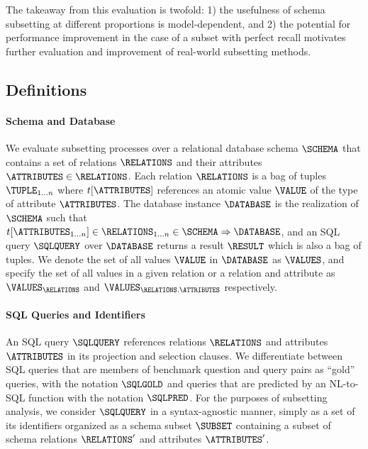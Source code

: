 The takeaway from this evaluation is twofold: 1) the usefulness of schema subsetting at different proportions is model-dependent, and 2) the potential for performance improvement in the case of a subset with perfect recall motivates further evaluation and improvement of real-world subsetting methods.

\subsection{Definitions}

\paragraph{\textbf{Schema and Database}}

We evaluate subsetting processes over a relational database schema $\SCHEMA$ that contains a set of relations $\RELATIONS$ and their attributes $\ATTRIBUTES \in \RELATIONS$.
Each relation $\RELATIONS$ is a bag of tuples $\TUPLE_{1...n}$ where $t[\ATTRIBUTES]$ references an atomic value $\VALUE$ of the type of attribute $\ATTRIBUTES$. 
The database instance $\DATABASE$ is the realization of $\SCHEMA$ such that 
$t[\ATTRIBUTES_{1...n}] \in \RELATIONS_{1...n} \in \SCHEMA \Rightarrow \DATABASE$, and an SQL query $\SQLQUERY$ over $\DATABASE$ returns a result $\RESULT$ which is also a bag of tuples.
We denote the set of all values $\VALUE$ in $\DATABASE$ as $\VALUES$, and specify the set of all values in a given relation or a relation and attribute as $\VALUES_\RELATIONS$ and $\VALUES_{\RELATIONS.\ATTRIBUTES}$ respectively.

\paragraph{\textbf{SQL Queries and Identifiers}}
An SQL query $\SQLQUERY$ references relations $\RELATIONS$ and attributes $\ATTRIBUTES$ in its projection and selection clauses. 
We differentiate between SQL queries that are members of benchmark question and query pairs as ``gold'' queries, with the notation $\SQLGOLD$ and queries that are predicted by an NL-to-SQL function with the notation $\SQLPRED$.
For the purposes of subsetting analysis, we consider $\SQLQUERY$ in a syntax-agnostic manner, simply as a set of its identifiers organized as a schema subset $\SUBSET$ containing a subset of schema relations $\RELATIONS'$ and attributes $\ATTRIBUTES'$.


